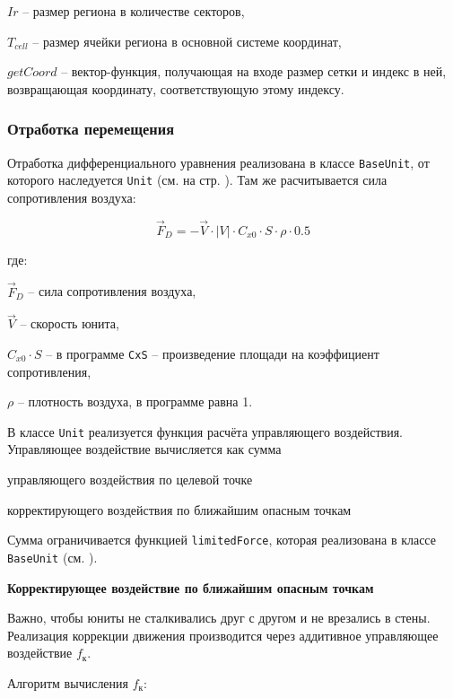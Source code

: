 $Ir$ -- размер региона в количестве секторов,

$T_{cell}$ -- размер ячейки региона в основной системе координат,

$getCoord$ -- вектор-функция, получающая на входе размер сетки и индекс в ней, возвращающая координату,
    соответствующую этому индексу.

\newpage
\subsubsection{Отработка перемещения}

Отработка дифференциального уравнения реализована в классе \verb|BaseUnit|, 
от которого наследуется \verb|Unit| (см.  на стр. \pageref{sec:unit_math_model}).
Там же расчитывается сила сопротивления воздуха:

$$\vec F_D = -\vec V \cdot |V| \cdot C_{x0} \cdot S \cdot \rho \cdot 0.5$$

где:

$\vec F_D$ -- сила сопротивления воздуха,

$\vec V$ -- скорость юнита,

$C_{x0} \cdot S$ -- в программе \verb|CxS| -- произведение площади на коэффициент сопротивления,

$\rho$ -- плотность воздуха, в программе равна 1.

В классе \verb|Unit| реализуется функция расчёта управляющего воздействия.
Управляющее воздействие вычисляется как сумма

\begin{mintemize}
\item управляющего воздействия по целевой точке
\item корректирующего воздействия по ближайшим опасным точкам
\end{mintemize}

Сумма ограничивается функцией \verb|limitedForce|, которая реализована в
классе \verb|BaseUnit| (см. \pageref{ref:unit_model_limited_force}).

\newpage
\textbf{Корректирующее воздействие по ближайшим опасным точкам}

Важно, чтобы юниты не сталкивались друг с другом и не врезались в стены.
Реализация коррекции движения производится через аддитивное управляющее
воздействие $f_{\text{к}}$. 

Алгоритм вычисления $f_{\text{к}}$:

